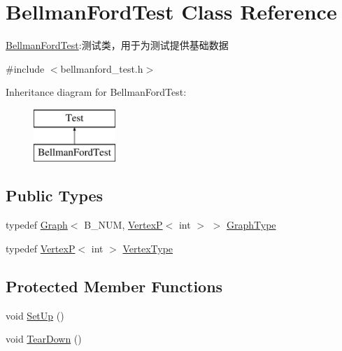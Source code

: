 \hypertarget{class_bellman_ford_test}{}\section{Bellman\+Ford\+Test Class Reference}
\label{class_bellman_ford_test}


\hyperlink{class_bellman_ford_test}{Bellman\+Ford\+Test}\+:测试类，用于为测试提供基础数据  




{\ttfamily \#include $<$bellmanford\+\_\+test.\+h$>$}

Inheritance diagram for Bellman\+Ford\+Test\+:\begin{figure}[H]
\begin{center}
\leavevmode
\includegraphics[height=2.000000cm]{class_bellman_ford_test}
\end{center}
\end{figure}
\subsection*{Public Types}
\begin{DoxyCompactItemize}
\item 
typedef \hyperlink{struct_introduction_to_algorithm_1_1_graph_algorithm_1_1_graph}{Graph}$<$ B\+\_\+\+N\+U\+M, \hyperlink{struct_introduction_to_algorithm_1_1_graph_algorithm_1_1_vertex_p}{Vertex\+P}$<$ int $>$ $>$ \hyperlink{class_bellman_ford_test_a81e8794fcae1d04ceb23de43c5944829}{Graph\+Type}
\item 
typedef \hyperlink{struct_introduction_to_algorithm_1_1_graph_algorithm_1_1_vertex_p}{Vertex\+P}$<$ int $>$ \hyperlink{class_bellman_ford_test_a823a571f7e631ee9e4f712440b35159d}{Vertex\+Type}
\end{DoxyCompactItemize}
\subsection*{Protected Member Functions}
\begin{DoxyCompactItemize}
\item 
void \hyperlink{class_bellman_ford_test_a8cb2e8d725e4c06914dafc73c73d94c6}{Set\+Up} ()
\item 
void \hyperlink{class_bellman_ford_test_a16ea847b45d890f27adf9381decdb5c8}{Tear\+Down} ()
\end{DoxyCompactItemize}
